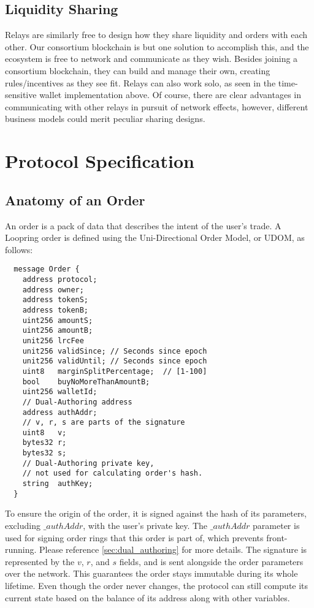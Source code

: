 \documentclass[UTF8,nofonts]{article}
\begin{document}
\begin{multicols}{2}
\subsection{Liquidity Sharing\label{sec:liquidity_sharing}}
Relays are similarly free to design how they share liquidity and orders with each other. Our consortium blockchain is but one solution to accomplish this, and the ecosystem is free to network and communicate as they wish. Besides joining a consortium blockchain, they can build and manage their own, creating rules/incentives as they see fit. Relays can also work solo, as seen in the time-sensitive wallet implementation above. Of course, there are clear advantages in communicating with other relays in pursuit of network effects, however, different business models could merit peculiar sharing designs. 


\section{Protocol Specification\label{sec:protocol}}

\subsection{Anatomy of an Order\label{anatomy}}
An order is a pack of data that describes the intent of the user's trade. A Loopring order is defined using the Uni-Directional Order Model, or UDOM, as follows:

\begin{verbatim}
  message Order {
    address protocol;
    address owner;
    address tokenS;
    address tokenB;
    uint256 amountS;
    uint256 amountB;
    unit256 lrcFee
    unit256 validSince; // Seconds since epoch
    unit256 validUntil; // Seconds since epoch
    uint8   marginSplitPercentage;  // [1-100]
    bool    buyNoMoreThanAmountB;
    uint256 walletId;
    // Dual-Authoring address
    address authAddr;
   	// v, r, s are parts of the signature
    uint8   v;       
    bytes32 r;
    bytes32 s;
    // Dual-Authoring private key,
    // not used for calculating order's hash.
    string  authKey;          
  }
\end{verbatim}
To ensure the origin of the order, it is signed against the hash of its parameters, excluding $\_authAddr$, with the user's private key. The $\_authAddr$ parameter is used for signing  order rings that this order is part of, which prevents front-running. Please reference \ref{sec:dual_authoring} for more details. The signature is represented by the $v$, $r$, and $s$ fields, and is sent alongside the order parameters over the network. This guarantees the order stays immutable during its whole lifetime. Even though the order never changes, the protocol can still compute its current state based on the balance of its address along with other variables.



\end{multicols}
\end{document}
